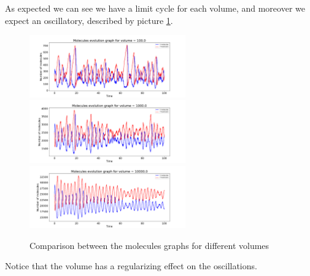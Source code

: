 As expected we can see we have a limit cycle for each volume, and moreover we expect an oscillatory, described by picture \ref{lec7:moleculesxyevolution_comparison}.

\begin{figure}[H]
    \centering
    \includegraphics[width=0.6\textwidth]{FIG/exercise_7_images/gillespiexy_time_volume100.0.png} 
    \vfill
    \includegraphics[width=0.6\textwidth]{FIG/exercise_7_images/gillespiexy_time_volume1000.0.png} 
    \vfill
    \includegraphics[width=0.6\textwidth]{FIG/exercise_7_images/gillespiexy_time_volume10000.0.png}
    \caption{Comparison between the molecules graphs for different volumes}
    \label{lec7:moleculesxyevolution_comparison}
\end{figure}

Notice that the volume has a regularizing effect on the oscillations.

